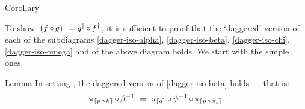 \documentclass[b]{subfiles}
\begin{document}
\begin{parsec}
\begin{point}[dagger-of-fg]{Corollary}
\begin{point}%
To show~$(f \mathop{\circ} g)^\dagger = g^\dagger \mathop{\circ} f^\dagger$,
    it is sufficient to proof that
    the `daggered' version
    of each of the subdiagrams
        \eqref{dagger-iso-alpha},
        \eqref{dagger-iso-beta},
        \eqref{dagger-iso-chi},
        \eqref{dagger-iso-omega} and
         of the above diagram holds.
We start with the simple ones.
\end{point}
\end{point}
\begin{point}{Lemma}%
In setting ,
    the daggered version of
        \eqref{dagger-iso-beta} holds --- that is:
    \begin{equation*}
        \pi_{\left\lceil p \mathop{\circ} k\right\rceil} \mathop{\circ} \beta^{-1}
            \ =\  \pi_{\left\lceil q\right\rceil} \mathop{\circ} \psi^{-1} \mathop{\circ} \pi_{\left\lceil p \mathop{\circ} \pi_t\right\rceil}.
    \end{equation*}
\end{point}
\end{parsec}
\end{document}
